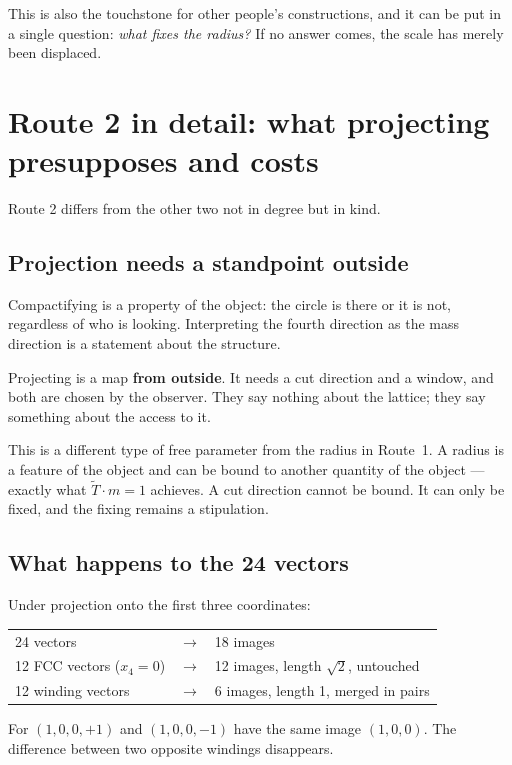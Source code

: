 \documentclass[11pt]{report}
\begin{document}
This is also the touchstone for other people's constructions, and it
can be put in a single question: \emph{what fixes the radius?} If no
answer comes, the scale has merely been displaced.

\chapter{Route 2 in detail: what projecting presupposes and costs}

Route 2 differs from the other two not in degree but in kind.

\section{Projection needs a standpoint outside}

Compactifying is a property of the object: the circle is there or it is
not, regardless of who is looking. Interpreting the fourth direction as
the mass direction is a statement about the structure.

Projecting is a map \textbf{from outside}. It needs a cut direction and
a window, and both are chosen by the observer. They say nothing about
the lattice; they say something about the access to it.

This is a different type of free parameter from the radius in Route~1.
A radius is a feature of the object and can be bound to another
quantity of the object --- exactly what $\tilde T \cdot m = 1$
achieves. A cut direction cannot be bound. It can only be fixed, and
the fixing remains a stipulation.

\section{What happens to the 24 vectors}

Under projection onto the first three coordinates:
\begin{center}
\begin{tabular}{lcl}
24 vectors & $\longrightarrow$ & 18 images \\[4pt]
12 FCC vectors ($x_4 = 0$) & $\longrightarrow$
  & 12 images, length $\sqrt2$, untouched \\
12 winding vectors & $\longrightarrow$
  & \phantom{1}6 images, length 1, merged in pairs \\
\end{tabular}
\end{center}

For $(1,0,0,+1)$ and $(1,0,0,-1)$ have the same image $(1,0,0)$. The
difference between two opposite windings disappears.
\end{document}
